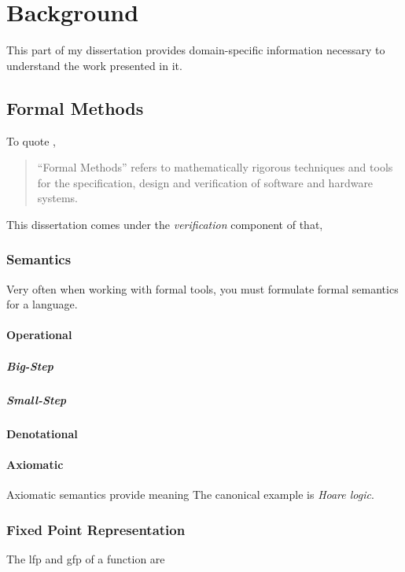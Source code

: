 \chapter{Background}\label{ch:background}
This part of my dissertation provides domain-specific information necessary to understand
the work presented in it.

\section{Formal Methods}
To quote \textcite{butler:fm},
\begin{quote}
  ``Formal Methods''%
  refers to mathematically rigorous techniques and tools
  for the specification, design and verification of software and hardware systems.
\end{quote}
This dissertation comes under the \emph{verification} component of that,%

\subsection{Semantics}
Very often when working with formal tools, you must formulate formal semantics
for a language.

\subsubsection{Operational}
\paragraph{Big-Step}
\paragraph{Small-Step}

\subsubsection{Denotational}

\subsubsection{Axiomatic}
Axiomatic semantics provide meaning 
The canonical example is \emph{Hoare logic}.%

\subsection{Fixed Point Representation}
The \ac{lfp} and \ac{gfp} of a function are

